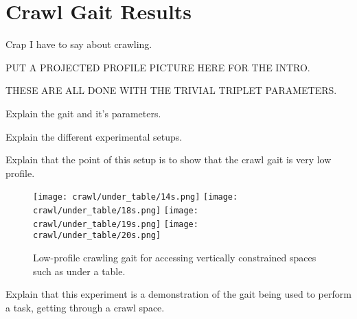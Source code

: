 \chapter{Crawl Gait Results} \label{ch:results_crawl_gait}



Crap I have to say about crawling.

PUT A PROJECTED PROFILE PICTURE HERE FOR THE INTRO.

THESE ARE ALL DONE WITH THE TRIVIAL TRIPLET PARAMETERS.

Explain the gait and it's parameters.

Explain the different experimental setups.

Explain that the point of this setup is to show that the crawl gait is very low profile.
\begin{figure}
  \vspace*{0.02in}
  \centerline{
    \texttt{[image: crawl/under\_table/14s.png]}
    \texttt{[image: crawl/under\_table/18s.png]}
    \texttt{[image: crawl/under\_table/19s.png]}
    \texttt{[image: crawl/under\_table/20s.png]}
  }
  \caption{Low-profile crawling gait for accessing vertically constrained spaces such as under a table.}
  \label{fig:nao_crawl1}
  \vspace*{-0.07in}
\end{figure}

Explain that this experiment is a demonstration of the gait being used to perform a task,
getting through a crawl space.

